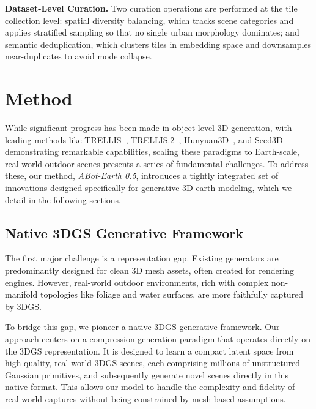 \documentclass{llmxive}
\providecommand{\paragraph}[1]{\noindent\textbf{#1.}\hspace*{1em}}
\providecommand{\method}{\textit{ABot-Earth 0.5}\xspace}
\begin{document}
\paragraph{Dataset-Level Curation}
Two curation operations are performed at the tile collection level: spatial diversity balancing, which tracks scene categories and applies stratified sampling so that no single urban morphology dominates; and semantic deduplication, which clusters tiles in embedding space and downsamples near-duplicates to avoid mode collapse.


\section{Method}
\label{sec3}

While significant progress has been made in object-level 3D generation, with leading methods like TRELLIS~\cite{xiang2025structured}, TRELLIS.2~\cite{xiang2025native}, Hunyuan3D~\cite{lai2025hunyuan3d25highfidelity3d,hunyuan3d22025tencent,yang2024hunyuan3d}, and Seed3D~\cite{Seed3D} demonstrating remarkable capabilities, scaling these paradigms to Earth-scale, real-world outdoor scenes presents a series of fundamental challenges. To address these, our method, \method{}, introduces a tightly integrated set of innovations designed specifically for generative 3D earth modeling, which we detail in the following sections.

\subsection{Native 3DGS Generative Framework}
\label{sec:3dgs_framework}

The first major challenge is a {representation gap}. Existing generators are predominantly designed for clean 3D mesh assets, often created for rendering engines. However, real-world outdoor environments, rich with complex non-manifold topologies like foliage and water surfaces, are more faithfully captured by 3DGS.

To bridge this gap, we pioneer a native 3DGS generative framework. Our approach centers on a compression-generation paradigm that operates directly on the 3DGS representation. It is designed to learn a compact latent space from high-quality, real-world 3DGS scenes, each comprising millions of unstructured Gaussian primitives, and subsequently generate novel scenes directly in this native format. This allows our model to handle the complexity and fidelity of real-world captures without being constrained by mesh-based assumptions.
\end{document}
